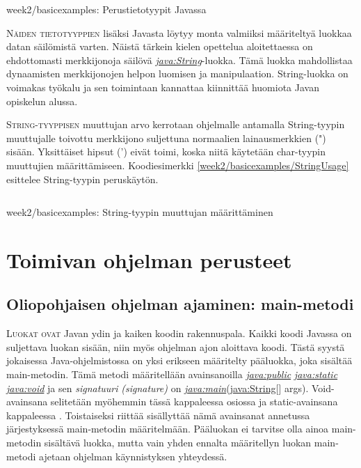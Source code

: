 \documentclass[openany]{book}
\newcommand{\newthought}[1]{\smallskip\textsc{#1}}
\newcommand{\eng}[1]{\textit{(#1)}}
\newcommand{\new}[1]{\textit{\gls{#1}}}
\newcommand{\neweng}[2]{\new{#1} \eng{#2}}
\newcommand{\java}[1]{\underline{\gls{java:#1}}}
\newcommand{\newjava}[1]{\textit{\java{#1}}}
\newcommand{\code}[3]{
	\begin{listing}
		\linespread{0.85}
		\inputminted{java}{OhjelmointiopasEsimerkit/src/#1/#2.java}
		\caption{#1: #3}
		\label{#1/#2}
	\end{listing}
}
\begin{document}
\code{week2/basicexamples}{DataTypes}{Perustietotyypit Javassa}

\newthought{Näiden tietotyyppien} lisäksi Javasta löytyy monta valmiiksi määriteltyä luokkaa datan
säilömistä varten. Näistä tärkein kielen opettelua aloitettaessa on ehdottomasti merkkijonoja
säilövä \newjava{String}-luokka. Tämä luokka mahdollistaa dynaamisten merkkijonojen helpon
luomisen ja manipulaation. String-luokka on voimakas työkalu ja sen toimintaan kannattaa
kiinnittää huomiota Javan opiskelun alussa.

\newthought{String-tyyppisen} muuttujan arvo kerrotaan ohjelmalle antamalla String-tyypin
muuttujalle toivottu merkkijono suljettuna normaalien lainausmerkkien (") sisään. Yksittäiset 
hipsut (') eivät toimi, koska niitä käytetään char-tyypin muuttujien määrittämiseen.
Koodiesimerkki \ref{week2/basicexamples/StringUsage} esittelee String-tyypin peruskäytön.

\code{week2/basicexamples}{StringUsage}{String-tyypin muuttujan määrittäminen}


\section{Toimivan ohjelman perusteet}
\label{ohjelman perusteista}

\subsection{Oliopohjaisen ohjelman ajaminen: main-metodi}
\label{main}

\newthought{Luokat ovat} Javan ydin ja kaiken koodin rakennuspala. Kaikki koodi Javassa on
suljettava luokan sisään, niin myös ohjelman ajon aloittava koodi. Tästä syystä jokaisessa
Java-ohjelmistossa on yksi erikseen määritelty pääluokka, joka sisältää main-metodin. Tämä
metodi määritellään avainsanoilla \newjava{public} \newjava{static} \newjava{void} ja sen 
\neweng{signatuuri}{signature} on \newjava{main}(\java{String}[] args). Void-avainsana selitetään
myöhemmin tässä kappaleessa osiossa  ja static-avainsana kappaleessa
. Toistaiseksi riittää sisällyttää nämä avainsanat annetussa järjestyksessä
main-metodin määritelmään. Pääluokan ei tarvitse olla ainoa main-metodin sisältävä luokka, mutta
vain yhden ennalta määritellyn luokan main-metodi ajetaan ohjelman käynnistyksen yhteydessä.
\end{document}
